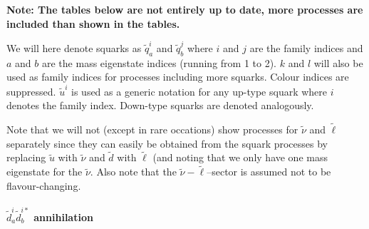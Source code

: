{\bfseries Note: The tables below are not entirely up to date, more processes are included
than shown in the tables.}

\smallskip

We will here denote squarks as $\tilde{q}^i_a$ and $\tilde{q}^j_b$ where $i$ and
$j$ are the family indices and $a$ and $b$ are the mass eigenstate indices
(running from 1 to 2). $k$ and $l$ will also be used as family indices for processes including more squarks. Colour indices are suppressed. $\tilde{u}^i$ is used as a
generic notation for any up-type squark where $i$ denotes the family index. Down-type 
squarks are denoted analogously.

Note that we will not (except in rare occations) show processes for $\tilde{\nu}$
and $\tilde{\ell}$ separately since they can easily be obtained from the squark
processes by replacing $\tilde{u}$ with $\tilde{\nu}$ and 
$\tilde{d}$ with $\tilde{\ell}$ (and noting that we only have one mass eigenstate
for the $\tilde{\nu}$. Also note that the $\tilde{\nu}-\tilde{\ell}$--sector
is assumed not to be flavour-changing.

\paragraph{$\tilde{d}^i_{a}\tilde{d}_{b}^{i*}$ annihilation}

